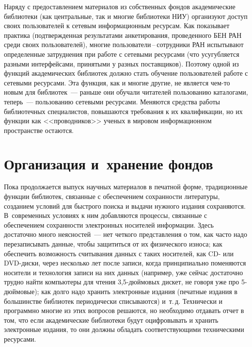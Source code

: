 \begin{multicols}{2}
{}
   
   Наряду с предоставлением материалов из собственных фондов академические 
библиотеки (как центральные, так и многие библиотеки НИУ) организуют доступ своих 
пользователей к сетевым информационным ресурсам. 
%
Как показывает практика 
(подтвержденная результатами анкетирования, проведенного БЕН РАН среди своих 
пользователей), многие поль\-зо\-ва\-те\-ли\,--\,со\-труд\-ни\-ки РАН испытывают 
определенные затруднения при работе с сетевыми ресурсами (что усугубляется разными 
интерфейсами, принятыми у разных поставщиков). Поэтому одной из функций 
академических библиотек должно стать обучение пользователей работе с сетевыми 
ресурсами. Эта функция, как и многие другие, не является чем-то новым для 
   биб\-лио\-тек~--- раньше они обучали читателей пользованию каталогами, теперь~---  
пользованию сетевыми ресурсами. Меняются средства работы библиотечных 
специалистов, повышаются требования к их квалификации, но их функции как 
<<проводников>> ученых в мировом информационном пространстве остаются. 

\vspace*{-6pt}

\section{Организация и~хранение фондов}

\vspace*{-2pt}
   
   Пока продолжается выпуск научных материалов в печатной форме, традиционные 
функции библиотек, связанные с обеспечением сохранности литературы, созданием 
условий для быстрого поиска и выдачи нужного издания сохраняются. В~современных 
условиях к ним добавляются процессы, связанные с обеспечением сохранности 
электронных носителей информации. 
%
Здесь достаточно много неясностей~--- нет четкого 
представления о том, как часто надо перезаписывать данные, чтобы защититься от их 
физического износа; как обеспечить возможность считывания данных с таких носителей, 
как CD- или DVD-дис\-ки, через несколько лет после записи, когда принципиально 
поменяются носители и технология записи на них данных (например, уже сейчас 
достаточно трудно найти компьютеры для чтения 3,5-дюй\-мо\-вых дискет, не говоря уже про 
5-дюй\-мо\-вые); как долго надо хранить электронные издания (печатные издания в 
большинстве библиотек периодически списываются) и~т.\,д. Технически и программно 
многие из этих вопросов решаются, но необходимо отдавать отчет в том, что если 
академические библиотеки будут оцифровывать и хранить электронные издания, то они 
должны обладать соответствующими техническими ресурсами. 


\end{multicols}
